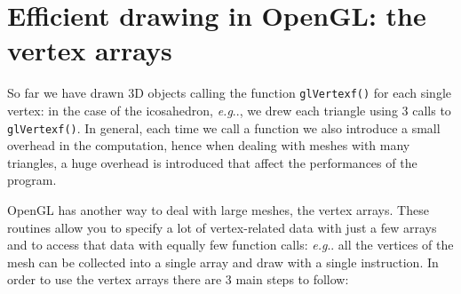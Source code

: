\documentclass[a4paper,11pt]{article}
\makeatletter
\DeclareRobustCommand\onedot{\futurelet\@let@token\@onedot}
\def\@onedot{\ifx\@let@token.\else.\null\fi\xspace}
\def\eg{\emph{e.g}\onedot} \def\Eg{\emph{E.g}\onedot}
\newcommand{\coden}[1]{\texttt{#1}}
\newcommand{\brand}[1]{\textsf{#1}\xspace}
\newcommand{\opengl}{\brand{OpenGL}}
\newcommand{\OpenGL}{\opengl}
\makeatother
\begin{document}
\section{Efficient drawing in \opengl: the vertex arrays}
\label{sec:arrays}


So far we have drawn 3D objects calling the function \coden{glVertexf()} for each single vertex: in the case of the icosahedron, \eg, we drew each triangle using 3 calls to \coden{glVertexf()}. In general, each time we call a function we also introduce a small overhead in the computation, hence when dealing with meshes with many triangles, a huge overhead is introduced that affect the performances of the program.

\OpenGL has another way to deal with large meshes, the vertex arrays. These routines allow you to specify a lot of vertex-related data with just a few arrays and to access that data with equally few function calls: \eg all the vertices of the mesh can be collected into a single array and draw with a single instruction. In order to use the vertex arrays there are 3 main steps to follow:
\end{document}
